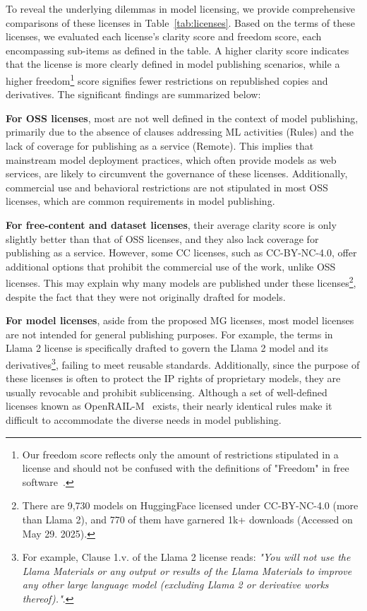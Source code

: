 To reveal the underlying dilemmas in model licensing, we provide comprehensive comparisons of these licenses in Table~\ref{tab:licenses}.
Based on the terms of these licenses, we evaluated each license's clarity score and freedom score, each encompassing sub-items as defined in the table.
A higher clarity score indicates that the license is more clearly defined in model publishing scenarios, while a higher freedom\footnote{Our freedom score reflects only the amount of restrictions stipulated in a license and should not be confused with the definitions of "Freedom" in free software~\cite{perens1999open}.} score signifies fewer restrictions on republished copies and derivatives.
The significant findings are summarized below:

 \textbf{For OSS licenses}, most are not well defined in the context of model publishing, primarily due to the absence of clauses addressing ML activities (Rules) and the lack of coverage for publishing as a service (Remote).
This implies that mainstream model deployment practices, which often provide models as web services, are likely to circumvent the governance of these licenses. 
Additionally, commercial use and behavioral restrictions are not stipulated in most OSS licenses, which are common requirements in model publishing.

 \textbf{For free-content and dataset licenses}, their average clarity score is only slightly better than that of OSS licenses, and they also lack coverage for publishing as a service.
However, some CC licenses, such as CC-BY-NC-4.0, offer additional options that prohibit the commercial use of the work, unlike OSS licenses. 
This may explain why many models are published under these licenses\footnote{There are 9,730 models on HuggingFace licensed under CC-BY-NC-4.0 (more than Llama 2), and 770 of them have garnered 1k+ downloads (Accessed on May 29. 2025).}, despite the fact that they were not originally drafted for models. 

 \textbf{For model licenses}, aside from the proposed MG licenses, most model licenses are not intended for general publishing purposes. 
For example, the terms in Llama 2 license is specifically drafted to govern the Llama 2 model and its derivatives\footnote{For example, Clause 1.v. of the Llama 2 license reads: \emph{"You will not use the Llama Materials or any output or results of the Llama Materials to improve any other large language model (excluding Llama 2 or derivative works thereof)."}.}, failing to meet reusable standards.
Additionally, since the purpose of these licenses is often to protect the IP rights of proprietary models, they are usually revocable and prohibit sublicensing.
Although a set of well-defined licenses known as OpenRAIL-M~\cite{contractor2022behavioral} exists, their nearly identical rules make it difficult to accommodate the diverse needs in model publishing.

